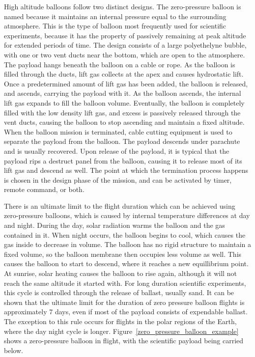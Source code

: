 High altitude balloons follow two distinct designs. The zero-pressure balloon is  named because it maintains an internal pressure equal to the surrounding atmosphere. This is the type of balloon most frequently used for scientific experiments, because it has the property of passively remaining at peak altitude for extended periods of time. The design consists of a large polyethelyne bubble, with one or two vent ducts near the bottom, which are open to the atmosphere. The payload hangs beneath the balloon on a cable or rope. As the balloon is filled through the ducts, lift gas collects at the apex and causes hydrostatic lift. Once a predetermined amount of lift gas has been added, the balloon is released, and ascends, carrying the payload with it. As the balloon ascends, the internal lift gas expands to fill the balloon volume. Eventually, the balloon is completely filled with the low density lift gas, and excess is passively released through the vent ducts, causing the balloon to stop ascending and maintain a fixed altitude. When the balloon mission is terminated, cable cutting equipment is used to separate the payload from the balloon. The payload descends under parachute and is usually recovered. Upon release of the payload, it is typical that the payload rips a destruct panel from the balloon, causing it to release most of its lift gas and descend as well. The point at which the termination process happens is chosen in the design phase of the mission, and can be activated by timer, remote command, or both. 

There is an ultimate limit to the flight duration which can be achieved using zero-pressure balloons, which is caused by internal temperature differences at day and night. During the day, solar radiation warms the balloon and the gas contained in it. When night occurs, the balloon begins to cool, which causes the gas inside to decrease in volume. The balloon has no rigid structure to maintain a fixed volume, so the balloon membrane then occupies less volume as well. This causes the balloon to start to descend, where it reaches a new equillibrium point. At sunrise, solar heating causes the balloon to rise again, although it will not reach the same altitude it started with. For long duration scientific experiments, this  cycle is controlled  through the release of ballast, usually sand. It can be shown that the ultimate limit for the duration of zero pressure balloon flights is approximately 7 days, even if most of the payload consists of expendable ballast. The exception to this rule occurs for flights in the polar regions of the Earth, where the day night cycle is longer. Figure~\ref{zero_pressure_balloon_example} shows a zero-pressure balloon in flight, with the scientific payload being carried below.

